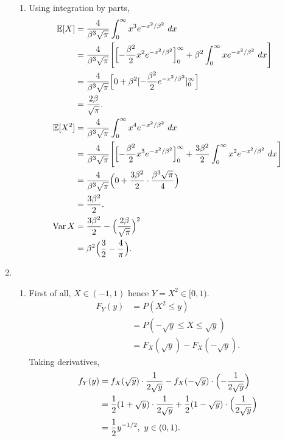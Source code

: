 \documentclass{article}
\DeclareMathOperator{\var}{Var}
\begin{document}
\begin{enumerate}
\begin{enumerate}
        \item Using integration by parts, 
        \begin{align*}
            \mathbb{E}[X]
            &= \frac{4}{\beta^3 \sqrt{\pi}} \int_{0}^{\infty} x^3 e^{-x^2 / \beta^2} \ dx \\
            &= \frac{4}{\beta^3 \sqrt{\pi}} \Biggl[ \Bigl[ -\frac{\beta^2}{2}x^2 e^{-x^2 / \beta^2} 
            \Bigr]_{0}^{\infty} + \beta^2 \int_{0}^{\infty} xe^{-x^2 / \beta^2} \ dx \Biggr] \\
            &= \frac{4}{\beta^3 \sqrt{\pi}} \Bigl[ 0 + \beta^2 
            [-\frac{\beta^2}{2}e^{-x^2 / \beta^2}]_{0}^{\infty} \Bigr] \\
            &= \frac{2\beta}{\sqrt{\pi}}. \\
            \mathbb{E}[X^2]
            &= \frac{4}{\beta^3 \sqrt{\pi}} \int_{0}^{\infty} x^4 e^{-x^2 / \beta^2} \ dx \\
            &= \frac{4}{\beta^3 \sqrt{\pi}} \Biggl[ \Bigl[ -\frac{\beta^2}{2}x^3 e^{-x^2 / \beta^2} 
            \Bigr]_{0}^{\infty} + \frac{3\beta^2}{2} \int_{0}^{\infty} x^2e^{-x^2 / \beta^2} \ dx \Biggr] \\
            &= \frac{4}{\beta^3 \sqrt{\pi}} \Bigl( 0 + \frac{3\beta^2}{2} \cdot 
            \frac{\beta^3 \sqrt{\pi}}{4} \Bigr) \\
            &= \frac{3\beta^2}{2}. \\
            \var{X}
            &= \frac{3\beta^2}{2} - \Bigl( \frac{2\beta}{\sqrt{\pi}} \Bigr)^2 \\
            &= \beta^2 \Bigl( \frac{3}{2} - \frac{4}{\pi} \Bigr).
        \end{align*}
    \end{enumerate}

    \item \begin{enumerate}
        \item First of all, $X \in (-1, 1)$ hence $Y = X^2 \in [0, 1)$.
        \begin{align*}
            F_{Y}(y)
            &= P(X^2 \leq y) \\
            &= P(-\sqrt{y} \leq X \leq \sqrt{y}) \\
            &= F_{X}(\sqrt{y}) - F_{X}(-\sqrt{y}).
        \end{align*}
        Taking derivatives, 
        \begin{align*}
            f_{Y}(y) 
            &= f_{X}(\sqrt{y}) \cdot \frac{1}{2\sqrt{y}} - f_{X}(-\sqrt{y}) \cdot 
            \Bigl( -\frac{1}{2\sqrt{y}} \Bigr) \\
            &= \frac{1}{2}(1 + \sqrt{y}) \cdot \frac{1}{2\sqrt{y}} + \frac{1}{2}(1 - \sqrt{y}) \cdot
            \Bigl( \frac{1}{2\sqrt{y}} \Bigr) \\
            &= \frac{1}{2}y^{-1 / 2}, \ y \in (0, 1).
        \end{align*}


\end{enumerate}
\end{enumerate}
\end{document}

